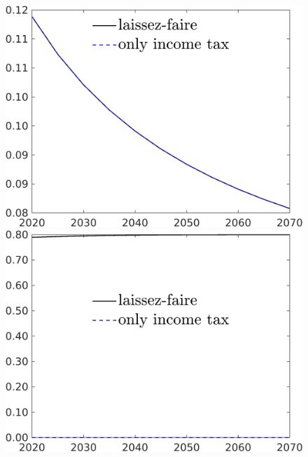 \begin{figure}[h!!]
\begin{minipage}[]{0.32\textwidth}
	\end{minipage}
	\begin{minipage}[]{0.32\textwidth}
		\includegraphics[width=1\textwidth]{../../codding_model/own_basedOnFried/optimalPol_190722_tidiedUp/figures/all_10Aout22/CountTaul_modnsk_target_sg_spillover0_sep1_extern0_PV1_etaa0.79_lgd1.png}
	\end{minipage}
	\begin{minipage}[]{0.32\textwidth}
		\includegraphics[width=1\textwidth]{../../codding_model/own_basedOnFried/optimalPol_190722_tidiedUp/figures/all_10Aout22/CountTaul_modnsk_target_snS_spillover0_sep1_extern0_PV1_etaa0.79_lgd1.png}

\end{minipage}
\end{figure}
